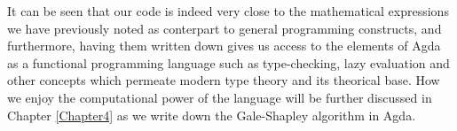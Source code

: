 {\begin{code}
\AgdaSpace{}%
\AgdaSymbol{)}\AgdaSpace{}%
\<%
\\
\>[0][@{}l@{\AgdaIndent{0}}]%
\>[2]\<%
\\
%
\>[2]\<%
\\
%
\>[2]\AgdaSpace{}%
\AgdaSymbol{:}\AgdaSpace{}%
\AgdaSymbol{(}\AgdaSpace{}%
\AgdaSymbol{:}\AgdaSpace{}%
\AgdaSymbol{)}\AgdaSpace{}%
\AgdaSpace{}%
\AgdaSpace{}%
\AgdaSpace{}%
\<%
\\
%
\>[2]\<%
\\
%
\>[2]\AgdaSpace{}%
\AgdaSymbol{:}\AgdaSpace{}%
\AgdaSymbol{(}\AgdaSpace{}%
\AgdaSymbol{:}\AgdaSpace{}%
\AgdaSymbol{)}\AgdaSpace{}%
\AgdaSpace{}%
\AgdaSpace{}%
\AgdaSpace{}%
\<%
\end{code}

It can be seen that our code is indeed very close to the mathematical expressions we have previously noted as conterpart to general programming constructs, and furthermore, having them written down gives us access to the elements of Agda as a functional programming language such as type-checking, lazy evaluation and other concepts which permeate modern type theory and its theorical base. How we enjoy the computational power of the language will be further discussed in Chapter \ref{Chapter4} as we write down the Gale-Shapley algorithm in Agda.
}
